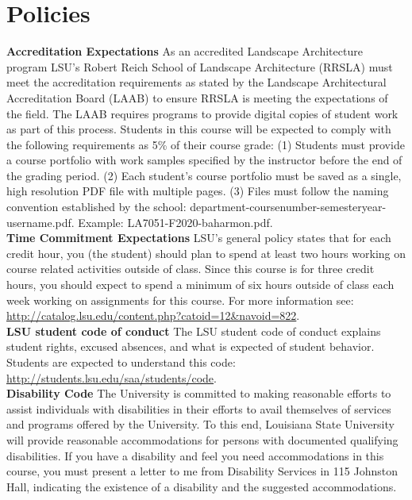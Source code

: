 \documentclass[11pt,article,oneside]{memoir}
\begin{document}
\section{Policies}

\noindent \textbf{Accreditation Expectations}
As an accredited Landscape Architecture program
LSU's Robert Reich School of Landscape Architecture (RRSLA) 
must meet the accreditation requirements 
as stated by the Landscape Architectural Accreditation
Board (LAAB) to ensure RRSLA is meeting the expectations of the field. 
The LAAB requires programs to provide digital copies 
of student work as part of this process.
Students in this course will be expected 
to comply with the following requirements
as 5\% of their course grade: 
(1) Students must provide a course portfolio
with work samples specified by the instructor 
before the end of the grading period. 
(2) Each student's course portfolio must be saved as 
a single, high resolution PDF file with multiple pages. 
(3) Files must follow the naming convention
established by the school: department-coursenumber-semesteryear-username.pdf.
Example: LA7051-F2020-baharmon.pdf.\\

\noindent \textbf{Time Commitment Expectations}
LSU's general policy states that for each credit hour, you (the student) should plan to
spend at least two hours working on course related activities outside of class. Since this course is for three credit hours, you should expect to spend a minimum of six hours outside of class each week working on assignments for this course. For more information see: 
\url{http://catalog.lsu.edu/content.php?catoid=12&navoid=822}.\\

\noindent \textbf{LSU student code of conduct}
The LSU student code of conduct explains student rights, excused absences, and what is expected of student behavior. Students are expected to understand this code:  \url{http://students.lsu.edu/saa/students/code}.\\ %

\noindent \textbf{Disability Code}
The University is committed to making reasonable efforts to assist individuals with disabilities in
their efforts to avail themselves of services and programs offered by the University. To this end,
Louisiana State University will provide reasonable accommodations for persons with
documented qualifying disabilities. If you have a disability and feel you need accommodations in
this course, you must present a letter to me from Disability Services in 115 Johnston Hall,
indicating the existence of a disability and the suggested accommodations.\\
\end{document}
